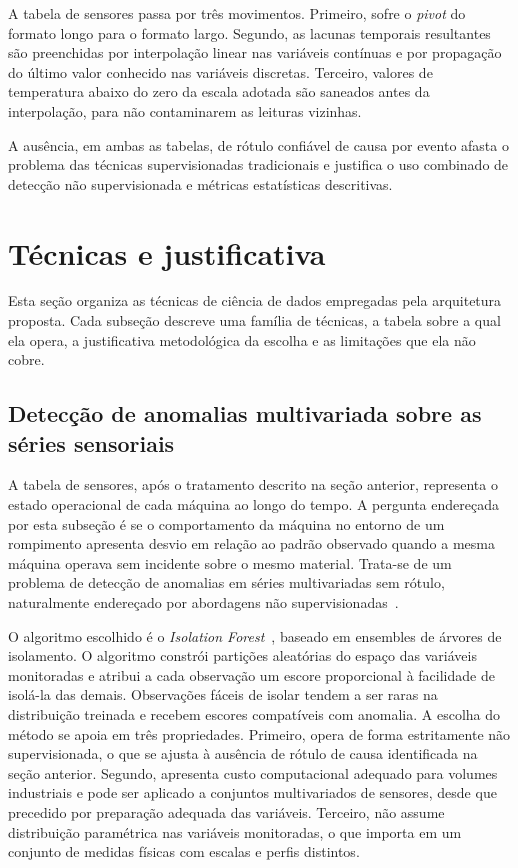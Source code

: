 \documentclass[12pt]{article}
\begin{document}
%
{A tabela de sensores passa por três movimentos. Primeiro, sofre o \textit{pivot} do formato longo para o formato largo. Segundo, as lacunas temporais resultantes são preenchidas por interpolação linear nas variáveis contínuas e por propagação do último valor conhecido nas variáveis discretas. Terceiro, valores de temperatura abaixo do zero da escala adotada são saneados antes da interpolação, para não contaminarem as leituras vizinhas.}
%

%
{A ausência, em ambas as tabelas, de rótulo confiável de causa por evento afasta o problema das técnicas supervisionadas tradicionais e justifica o uso combinado de detecção não supervisionada e métricas estatísticas descritivas.}

\section{Técnicas e justificativa}
%
{Esta seção organiza as técnicas de ciência de dados empregadas pela arquitetura proposta. Cada subseção descreve uma família de técnicas, a tabela sobre a qual ela opera, a justificativa metodológica da escolha e as limitações que ela não cobre.}
%

\subsection{Detecção de anomalias multivariada sobre as séries sensoriais}
%
{A tabela de sensores, após o tratamento descrito na seção anterior, representa o estado operacional de cada máquina ao longo do tempo. A pergunta endereçada por esta subseção é se o comportamento da máquina no entorno de um rompimento apresenta desvio em relação ao padrão observado quando a mesma máquina operava sem incidente sobre o mesmo material. Trata-se de um problema de detecção de anomalias em séries multivariadas sem rótulo, naturalmente endereçado por abordagens não supervisionadas~\cite{9525836}.}
%

%
{O algoritmo escolhido é o \textit{Isolation Forest}~\cite{Liu2008}, baseado em ensembles de árvores de isolamento. O algoritmo constrói partições aleatórias do espaço das variáveis monitoradas e atribui a cada observação um escore proporcional à facilidade de isolá-la das demais. Observações fáceis de isolar tendem a ser raras na distribuição treinada e recebem escores compatíveis com anomalia. A escolha do método se apoia em três propriedades. Primeiro, opera de forma estritamente não supervisionada, o que se ajusta à ausência de rótulo de causa identificada na seção anterior. Segundo, apresenta custo computacional adequado para volumes industriais e pode ser aplicado a conjuntos multivariados de sensores, desde que precedido por preparação adequada das variáveis. Terceiro, não assume distribuição paramétrica nas variáveis monitoradas, o que importa em um conjunto de medidas físicas com escalas e perfis distintos.}
%
\end{document}
